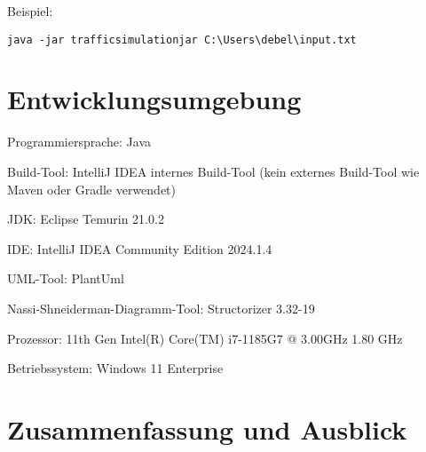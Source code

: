 \documentclass[a4paper,12pt]{report}
\begin{document}
Beispiel:


\texttt{java -jar trafficsimulationjar C:\textbackslash Users\textbackslash debel\textbackslash input.txt}



\chapter{Entwicklungsumgebung}
Programmiersprache: Java

Build-Tool: IntelliJ IDEA internes Build-Tool (kein externes Build-Tool wie Maven oder Gradle verwendet)

JDK: Eclipse Temurin 21.0.2

IDE: IntelliJ IDEA Community Edition 2024.1.4

UML-Tool: PlantUml

Nassi-Shneiderman-Diagramm-Tool: Structorizer 3.32-19

Prozessor: 11th Gen Intel(R) Core(TM) i7-1185G7 @ 3.00GHz   1.80 GHz 

Betriebssystem: Windows 11 Enterprise

\chapter{Zusammenfassung und Ausblick}

% 
\end{document}
